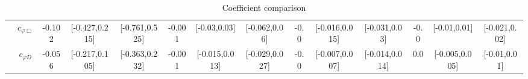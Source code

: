\documentclass{article}
\begin{document}
\begin{table}[H]
\begin{tabular}{|c|c|c|c|c|c|c|c|c|c|c|c|c|c|}
 & $c_{\varphi \Box}$ & -0.102                             & [-0.427,0.215]                                 & [-0.761,0.525] & -0.001                             & [-0.03,0.03]                                 & [-0.062,0.06] & -0.0                             & [-0.016,0.015]                                 & [-0.031,0.03] & -0.0                             & [-0.01,0.01]                                 & [-0.021,0.02] \\ \cline{2-14}
 & $c_{\varphi D}$ & -0.056                             & [-0.217,0.105]                                 & [-0.363,0.232] & -0.001                             & [-0.015,0.013]                                 & [-0.029,0.027] & -0.0                             & [-0.007,0.007]                                 & [-0.014,0.014] & 0.0                             & [-0.005,0.005]                                 & [-0.01,0.01] \\ \cline{2-14}
\hline
\end{tabular}
\caption{Coefficient comparison}
\end{table}
\end{document}
